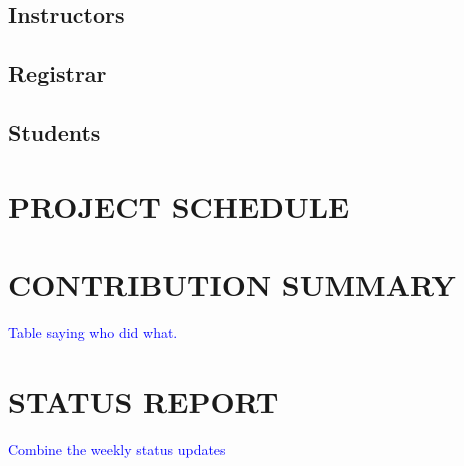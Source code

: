 \documentclass[11pt]{article}
\begin{document}
\subsection{Instructors}
\subsection{Registrar}
\subsection{Students}

\section{PROJECT SCHEDULE} %

\section{CONTRIBUTION SUMMARY} %
\textcolor{blue}{Table saying who did what.}

\section{STATUS REPORT} %
\textcolor{blue}{Combine the weekly status updates}
\end{document}

